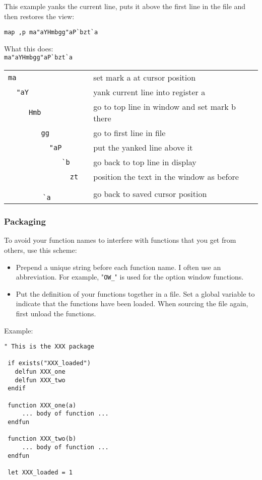 This example yanks the current line, puts it above the first line in the file and then restores the view:

\begin{Verbatim}[samepage=true]
 map ,p ma"aYHmbgg"aP`bzt`a
\end{Verbatim}

What this does:\\
\verb!ma"aYHmbgg"aP`bzt`a!
\begin{center} \begin{tabular}{c l} %
\verb!ma                 ! & set mark a at cursor position \\
\verb!  "aY              ! & yank current line into register a \\
\verb!     Hmb           ! & go to top line in window and set mark b there \\
\verb!        gg         ! & go to first line in file \\
\verb!          "aP      ! & put the yanked line above it \\
\verb!             `b    ! & go back to top line in display \\
\verb!               zt  ! & position the text in the window as before \\
\verb!                 `a! & go back to saved cursor position \\
\end{tabular} \end{center}

\subsubsection{Packaging}
To avoid your function names to interfere with functions that you get from others, use this scheme:
\begin{itemize} 
				\item Prepend a unique string before each function name.
								I often use an abbreviation.
								For example, "\verb!OW_!" is used for the option window functions.
				\item Put the definition of your functions together in a file.
								Set a global variable to indicate that the functions have been loaded.
								When sourcing the file again, first unload the functions.
\end{itemize}

Example:

\begin{Verbatim}[samepage=true]
 " This is the XXX package

 if exists("XXX_loaded")
   delfun XXX_one
   delfun XXX_two
 endif

 function XXX_one(a)
     ... body of function ...
 endfun

 function XXX_two(b)
     ... body of function ...
 endfun

 let XXX_loaded = 1
\end{Verbatim}
